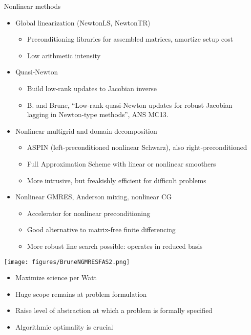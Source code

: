 \documentclass{beamer}
\begin{document}
\begin{frame}{Nonlinear methods}
  \begin{itemize}
  \item Global linearization (NewtonLS, NewtonTR)
    \begin{itemize}
    \item Preconditioning libraries for assembled matrices, amortize setup cost
    \item Low arithmetic intensity
    \end{itemize}
  \item Quasi-Newton
    \begin{itemize}
    \item Build low-rank updates to Jacobian inverse
    \item B. and Brune, ``Low-rank quasi-Newton updates for robust Jacobian lagging in Newton-type methods'', ANS MC13.
    \end{itemize}
  \item Nonlinear multigrid and domain decomposition
    \begin{itemize}
    \item ASPIN (left-preconditioned nonlinear Schwarz), also right-preconditioned
    \item Full Approximation Scheme with linear or nonlinear smoothers
    \item More intrusive, but freakishly efficient for difficult problems
    \end{itemize}
  \item Nonlinear GMRES, Anderson mixing, nonlinear CG
    \begin{itemize}
    \item Accelerator for nonlinear preconditioning
    \item Good alternative to matrix-free finite differencing
    \item More robust line search possible: operates in reduced basis
    \end{itemize}
  \end{itemize}
\end{frame}

\begin{frame}
  \texttt{[image: figures/BruneNGMRESFAS2.png]}
\end{frame}

% 
% 
% 
% 

\begin{frame}\LARGE
  \begin{itemize}
  \item Maximize science per Watt
  \item Huge scope remains at problem formulation
  \item Raise level of abstraction at which a problem is formally specified
  \item Algorithmic optimality is crucial
  \end{itemize}
\end{frame}
\end{document}
